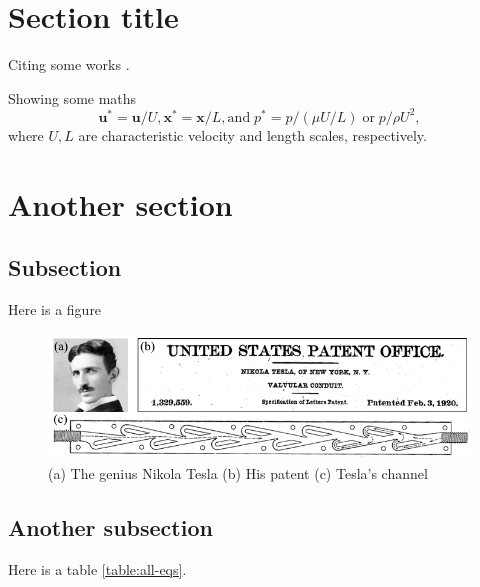 

\section{Section title}
\lipsum[1]

Citing some works \cite{strogatz2001exploring, singer2013natural}. 

Showing some maths 
\begin{equation}
    \boldsymbol{u}^* = \boldsymbol{u}/U, \boldsymbol{x}^* = \boldsymbol{x}/L, \mathrm{and} \; p^* = p /(\mu U/L)  \; \mathrm{or}  \;  p/\rho U^2,
\end{equation}
where $U, L$ are characteristic velocity and length scales, respectively.


\section{Another section }


\subsection{Subsection}

\lipsum[1]

Here is a figure
\begin{figure}
\centering
\includegraphics[width=16.5cm]{figures/ch_introductory/fig1.pdf}\vspace{-0.2cm}
\caption{(a) The genius Nikola Tesla (b) His patent (c) Tesla's channel }
\label{fig:chintro-patent}
\end{figure}
 

\subsection{Another subsection}
\lipsum[1]

Here is a table
\ref{table:all-eqs}. 

